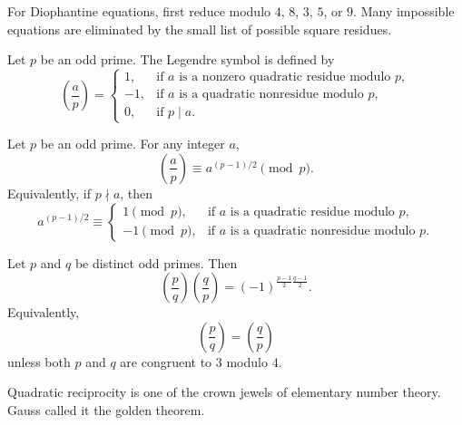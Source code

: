     \begin{tactic}
        For Diophantine equations, first reduce modulo $4$, $8$, $3$, $5$, or $9$. Many impossible equations are eliminated by
        the small list of possible square residues.
    \end{tactic}

    \begin{definition}
        Let $p$ be an odd prime. The Legendre symbol is defined by
        \[
            \left(\frac{a}{p}\right)
            =
            \begin{cases}
                1, & \text{if }a\text{ is a nonzero quadratic residue modulo }p, \\
                -1, & \text{if }a\text{ is a quadratic nonresidue modulo }p, \\
                0, & \text{if }p\mid a.
            \end{cases}
        \]
    \end{definition}

    \begin{theorem}
        Let $p$ be an odd prime. For any integer $a$,
        \[
            \left(\frac{a}{p}\right)
            \equiv
            a^{(p-1)/2}
            \pmod p.
        \]
        Equivalently, if $p\nmid a$, then
        \[
            a^{(p-1)/2}
            \equiv
            \begin{cases}
                1\pmod p, & \text{if }a\text{ is a quadratic residue modulo }p, \\
                -1\pmod p, & \text{if }a\text{ is a quadratic nonresidue modulo }p.
            \end{cases}
        \]
    \end{theorem}

    \begin{theorem}
        Let $p$ and $q$ be distinct odd primes. Then
        \[
            \left(\frac{p}{q}\right)
            \left(\frac{q}{p}\right)
            =
            (-1)^{\frac{p-1}{2}\frac{q-1}{2}}.
        \]
        Equivalently,
        \[
            \left(\frac{p}{q}\right)
            =
            \left(\frac{q}{p}\right)
        \]
        unless both $p$ and $q$ are congruent to $3$ modulo $4$.
    \end{theorem}

    \begin{remark}
        Quadratic reciprocity is one of the crown jewels of elementary number
        theory. Gauss called it the golden theorem.
    \end{remark}

